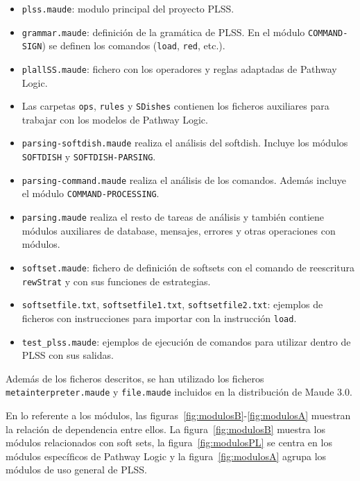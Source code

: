 \begin{itemize}
\item \texttt{plss.maude}: modulo principal del proyecto PLSS.

\item \texttt{grammar.maude}: definición de la gramática de PLSS.
En el módulo \texttt{COMMAND-SIGN}) se definen los comandos (\texttt{load}, \texttt{red}, etc.). 

\item \texttt{plallSS.maude}: fichero con los operadores y reglas adaptadas de Pathway Logic.

\item Las carpetas \texttt{ops}, \texttt{rules} y \texttt{SDishes}
contienen los ficheros auxiliares para trabajar con los modelos de Pathway Logic.

\item \texttt{parsing-softdish.maude} realiza el análisis del softdish. Incluye los módulos \texttt{SOFTDISH} y \texttt{SOFTDISH-PARSING}.

\item \texttt{parsing-command.maude} realiza el análisis de los comandos. Además incluye el módulo \texttt{COMMAND-PROCESSING}.

\item \texttt{parsing.maude} realiza el resto de tareas de análisis y también contiene módulos auxiliares de database, mensajes, errores y otras operaciones con módulos.

\item \texttt{softset.maude}: fichero de definición de softsets con el comando de reescritura \texttt{rewStrat} y con sus funciones de estrategias.

\item \texttt{softsetfile.txt}, \texttt{softsetfile1.txt}, \texttt{softsetfile2.txt}: ejemplos de ficheros con instrucciones para importar con la instrucción \texttt{load}.

\item \texttt{test\_plss.maude}: ejemplos de ejecución de comandos para utilizar dentro de PLSS con sus salidas.
\end{itemize}
\medskip

Además de los ficheros descritos, se han utilizado los ficheros \texttt{metainterpreter.maude} y \texttt{file.maude} incluidos en la distribución de Maude 3.0.
\bigskip


En lo referente a los módulos, las figuras~\ref{fig:modulosB}-\ref{fig:modulosA} muestran la relación de dependencia entre ellos. 
La figura~\ref{fig:modulosB} muestra los módulos relacionados con soft sets,
la figura~\ref{fig:modulosPL} se centra en los módulos específicos de Pathway Logic y
la figura~\ref{fig:modulosA} agrupa los módulos de uso general de PLSS.

